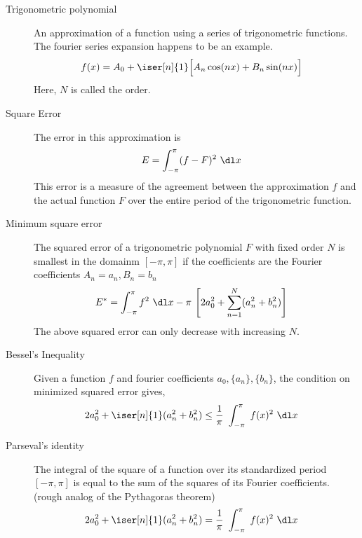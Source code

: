 \begin{description}
    \item[Trigonometric polynomial] An approximation of a function using a series of
        trigonometric functions. The fourier series expansion happens to be an example.
        \begin{align}
            f(x) & = A_0 + \iser[n]{1} \Big[ A_n \cos(nx) + B_n \sin(nx) \Big]
        \end{align}
        Here, $ N $ is called the order.

    \item[Square Error] The error in this approximation is
        \begin{align}
            E & = \int_{-\pi}^{\pi} (f - F)^2\ \dl x
        \end{align}
        This error is a measure of the agreement between the approximation $ f $ and
        the actual function $ F $ over the entire period of the trigonometric function.

    \item[Minimum square error] The squared error of a trigonometric polynomial
        $ F $ with fixed order $ N $ is smallest in the domainm $[-\pi, \pi] $ if the
        coefficients are the Fourier coefficients $ A_n = a_n, B_n = b_n $
        \begin{align}
            E^* & = \int_{-\pi}^{\pi} f^2\ \dl x  - \pi\ \Bigg[ 2a_0^2
                + \sum_{n=1}^{N} (a_n^2 + b_n^2) \Bigg]
        \end{align}
        The above squared error can only decrease with increasing $ N $.

    \item[Bessel's Inequality] Given a function $ f $ and fourier coefficients $ a_0,
            \{a_n\}, \{b_n\} $, the condition on minimized squared error gives,
        \begin{align}
            2a_0^2 + \iser[n]{1} (a_n^2 + b_n^2) & \leq \frac{1}{\pi}\ \int_{-\pi}^{\pi}
            \ f(x)^2\ \dl x
        \end{align}

    \item[Parseval's identity] The integral of the square of a function over its
        standardized period $ [-\pi, \pi] $ is equal to the sum of the squares of its
        Fourier coefficients. (rough analog of the Pythagoras theorem)
        \begin{align}
            2a_0^2 + \iser[n]{1} (a_n^2 + b_n^2) & = \frac{1}{\pi}\ \int_{-\pi}^{\pi}
            \ f(x)^2\ \dl x
        \end{align}
\end{description}

